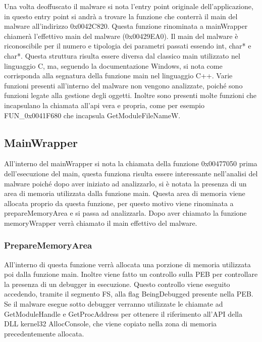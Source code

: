 \documentclass[]{article}
\begin{document}
Una volta deoffuscato il malware si nota l'entry point originale dell'applicazione, in questo entry point si andrà a trovare la funzione che conterrà il main del malware all'indirizzo 0x0042C820. Questa funzione rinominata a mainWrapper chiamerà l'effettivo main del malware (0x00429EA0). Il main del malware è riconoscibile per il numero e tipologia dei parametri passati essendo int, char* e char*.  Questa struttura risulta essere diversa dal classico main utilizzato nel linguaggio C, ma, seguendo la documentazione Windows, si nota come corrisponda alla segnatura della funzione main nel linguaggio C++.  Varie funzioni presenti all'interno del malware non vengono analizzate, poiché sono funzioni legate alla gestione degli oggetti.  Inoltre sono presenti molte funzioni che incapsulano la chiamata all'api vera e propria, come per esempio FUN\_0x0041F680 che incapsula GetModuleFileNameW.

\subsection{MainWrapper}
All'interno del mainWrapper si nota la chiamata della funzione 0x00477050 prima dell'esecuzione del main, questa funziona risulta essere interessante nell'analisi del malware poiché dopo aver iniziato ad analizzarlo, si è notata la presenza di un area di memoria utilizzata dalla funzione main. Questa area di memoria viene allocata proprio da questa funzione, per questo motivo viene rinominata a prepareMemoryArea e si passa ad analizzarla. Dopo aver chiamato la funzione memoryWrapper verrà chiamato il main effettivo del malware.

\subsubsection{PrepareMemoryArea}
All'interno di questa funzione verrà allocata una porzione di memoria utilizzata poi dalla funzione main. Inoltre viene fatto un controllo sulla PEB per controllare la presenza di un debugger in esecuzione. Questo controllo viene eseguito accedendo, tramite il segmento FS, alla flag BeingDebugged presente nella PEB. Se il malware esegue sotto debugger verranno utilizzate le chiamate ad GetModuleHandle e GetProcAddress per ottenere il riferimento all'API della DLL kernel32 AllocConsole, che viene copiato nella zona di memoria precedentemente allocata. 
\end{document}
